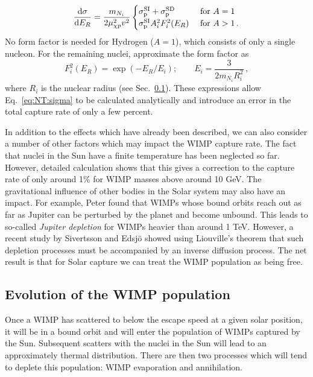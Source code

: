 \begin{equation}
\dbd{\sigma}{E_R} = \frac{m_{N_i}}{2\mu_{\chi p}^2 v^2}
\begin{cases}
\sigmapsi + \sigmapsd & \textrm{ for } A = 1 \\
\sigmapsi A_i^2 F_i^2(E_R) & \textrm{ for } A > 1 \,.
\end{cases}
\end{equation}
No form factor is needed for Hydrogen ($A=1$), which consists of only a single nucleon. For the remaining nuclei, approximate the form factor as \cite{Gould:1987}
\begin{equation}
F^2_i(E_R) = \exp(-E_R/E_i); \qquad E_i = \frac{3}{2m_{N_i} R_i^2}\,,
\end{equation}
where $R_i$ is the nuclear radius (see Sec.~\ref{}). These expressions allow Eq.~\ref{eq:NT:sigma} to be calculated analytically and introduce an error in the total capture rate of only a few percent.


In addition to the effects which have already been described, we can also consider a number of other factors which may impact the WIMP capture rate. The fact that nuclei in the Sun have a finite temperature has been neglected so far. However, detailed calculation \cite{Press:1985,Gould:1987} shows that this gives a correction to the capture rate of only around 1\% for WIMP masses above around 10 GeV. The gravitational influence of other bodies in the Solar system may also have an impact. For example, Peter \cite{Peter:2009} found that WIMPs whose bound orbits reach out as far as Jupiter can be perturbed by the planet and become unbound. This leads to so-called \textit{Jupiter depletion} for WIMPs heavier than around 1 TeV. However, a recent study by Sivertsson and Edsj\"{o} \cite{Sivertsson:2012} showed using Liouville's theorem that such depletion processes must be accompanied by an inverse diffusion process. The net result is that for Solar capture we can treat the WIMP population as being free.


\subsection{Evolution of the WIMP population}

Once a WIMP has scattered to below the escape speed at a given solar position, it will be in a bound orbit and will enter the population of WIMPs captured by the Sun. Subsequent scatters with the nuclei in the Sun will lead to an approximately thermal distribution. There are then two processes which will tend to deplete this population: WIMP evaporation and annihilation.  

